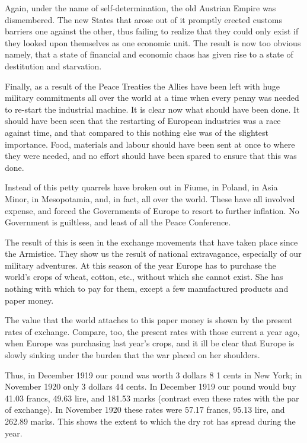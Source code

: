 \documentclass{book}
\begin{document}
Again, under the name of self-determination, the old Austrian Empire was dismembered. The new States that arose out of it promptly erected customs barriers one against the other, thus failing to realize that they could only exist if they looked upon themselves as one economic unit. The result is now too obvious namely, that a state of financial and economic chaos has given rise to a state of destitution and starvation.

Finally, as a result of the Peace Treaties the Allies have been left with huge military commitments all over the world at a time when every penny was needed to re-start the industrial machine. It is clear now what should have been done. It should have been seen that the restarting of European industries was a race against time, and that compared to this nothing else was of the slightest importance. Food, materials and labour should have been sent at once to where they were needed, and no effort should have been spared to ensure that this was done.

Instead of this petty quarrels have broken out in Fiume, in Poland, in Asia Minor, in Mesopotamia, and, in fact, all over the world. These have all involved expense, and forced the Governments of Europe to resort to further inflation. No Government is guiltless, and least of all the Peace Conference.

The result of this is seen in the exchange movements that have taken place since the Armistice. They show us the result of national extravagance, especially of our military adventures. At this season of the year Europe has to purchase the world’s crops of wheat, cotton, etc., without which she cannot exist. She has nothing with which to pay for them, except a few manufactured products and paper money.

The value that the world attaches to this paper money is shown by the present rates of exchange. Compare, too, the present rates with those current a year ago, when Europe was purchasing last year’s crops, and it ill be clear that Europe is slowly sinking under the burden that the war placed on her shoulders.

Thus, in December 1919 our pound was worth 3 dollars 8 1 cents in New York; in November 1920 only 3 dollars 44 cents. In December 1919 our pound would buy 41.03 francs, 49.63 lire, and 181.53 marks (contrast even these rates with the par of exchange). In November 1920 these rates were 57.17 francs, 95.13 lire, and 262.89 marks. This shows the extent to which the dry rot has spread during the year.
\end{document}
